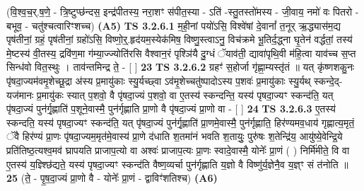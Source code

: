 \documentclass[17pt]{extarticle}
\begin{document}
                  \newline
                      (वि॒श्व॒च॒र्.ष॒णे॒ - त्रि॒ष्टुप्छ॑न्दस॒ इन्द्र॑पीतस्य॒ नरा॒शꣳ स॑पीत॒स्या - ऽति॑ -स्तु॒तस्तो॑मस्य - जी॒वाय॒ नमो॑ वः पितरो - बभूव॒ - चतु॑श्चत्वारिꣳशच्च)  \textbf{(A5)} \newline \newline
                                        \textbf{ TS 3.2.6.1} \newline
                  म॒ही॒नां पयो॑ऽसि॒ विश्वे॑षां दे॒वानां᳚ त॒नूर् ऋ॒द्ध्यास॑म॒द्य पृष॑तीनां॒ ग्रहं॒ पृष॑तीनां॒ ग्रहो॑ऽसि॒ विष्णो॒र्॒.हृद॑यम॒स्येक॑मिष॒ विष्णु॒स्त्वाऽनु॒ विच॑क्रमे भू॒तिर्द॒द्ध्ना घृ॒तेन॑ वर्द्धतां॒ तस्य॑ मे॒ष्टस्य॑ वी॒तस्य॒ द्रवि॑ण॒मा ग॑म्या॒ज्ज्योति॑रसि वैश्वान॒रं पृश्ञि॑यै दु॒ग्धं ॅयाव॑ती॒ द्यावा॑पृथि॒वी म॑हि॒त्वा याव॑च्च स॒प्त सिन्ध॑वो वित॒स्थुः । ताव॑न्तमिन्द्र ते॒ - [  ] \textbf{  23} \newline
                  \newline
                                \textbf{ TS 3.2.6.2} \newline
                  ग्रहꣳ॑ स॒होर्जा गृ॑ह्णा॒म्यस्तृ॑तं ॥ यत् कृ॑ष्णशकु॒नः पृ॑षदा॒ज्यम॑वमृ॒शेच्छू॒द्रा अ॑स्य प्र॒मायु॑काः स्यु॒र्यच्छ्वा ऽव॑मृ॒शेच्चतु॑ष्पादोऽस्य प॒शवः॑ प्र॒मायु॑काः स्यु॒र्यथ् स्कन्दे॒द्-यज॑मानः प्र॒मायु॑कः स्यात् प॒शवो॒ वै पृ॑षदा॒ज्यं प॒शवो॒ वा ए॒तस्य॑ स्कन्दन्ति॒ यस्य॑ पृषदा॒ज्यꣳ स्कन्द॑ति॒ यत् पृ॑षदा॒ज्यं पुन॑र्गृ॒ह्णाति॑ प॒शूने॒वास्मै॒ पुन॑र्गृह्णाति प्रा॒णो वै पृ॑षदा॒ज्यं प्रा॒णो वा - [  ] \textbf{  24} \newline
                  \newline
                                \textbf{ TS 3.2.6.3} \newline
                  ए॒तस्य॑ स्कन्दति॒ यस्य॑ पृषदा॒ज्यꣳ स्कन्द॑ति॒ यत् पृ॑षदा॒ज्यं पुन॑र्गृ॒ह्णाति॑ प्रा॒णमे॒वास्मै॒ पुन॑र्गृह्णाति॒ हिर॑ण्यमव॒धाय॑ गृह्णात्य॒मृतं॒ ॅवै हिर॑ण्यं प्रा॒णः पृ॑षदा॒ज्यम॒मृत॑मे॒वास्य॑ प्रा॒णे द॑धाति श॒तमा॑नं भवति श॒तायुः॒ पुरु॑षः श॒तेन्द्रि॑य॒ आयु॑ष्ये॒वेन्द्रि॒ये प्रति॑तिष्ठ॒त्यश्व॒मव॑ घ्रापयति प्राजाप॒त्यो वा अश्वः॑ प्राजाप॒त्यः प्रा॒णः स्वादे॒वास्मै॒ योनेः᳚ प्रा॒णं ( ) निर्मि॑मीते॒ वि वा ए॒तस्य॑ य॒ज्ञ्श्छि॑द्यते॒ यस्य॑ पृषदा॒ज्यꣳ स्कन्द॑ति वैष्ण॒व्यर्चा पुन॑र्गृह्णाति य॒ज्ञो वै विष्णु॑र्य॒ज्ञेनै॒व य॒ज्ञ्ꣳ सं त॑नोति ॥ \textbf{  25} \newline
                  \newline
                      (ते॒ - पृ॒ष॒दा॒ज्यं प्रा॒णो वै - योनेः᳚ प्रा॒णं - द्वाविꣳ॑शतिश्च)  \textbf{(A6)} \newline \newline
\end{document}
